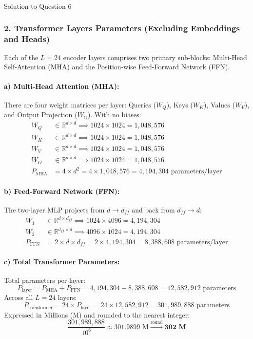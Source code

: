 \documentclass[11pt,a4paper]{article}
\begin{document}
\begin{solutionbox}{Solution to Question 6}
\subsubsection*{2. Transformer Layers Parameters (Excluding Embeddings and Heads)}
Each of the $L = 24$ encoder layers comprises two primary sub-blocks: Multi-Head Self-Attention (MHA) and the Position-wise Feed-Forward Network (FFN).

\paragraph{a) Multi-Head Attention (MHA):}
There are four weight matrices per layer: Queries ($W_Q$), Keys ($W_K$), Values ($W_V$), and Output Projection ($W_O$). With no biases:
\begin{align*}
W_Q &\in \mathbb{R}^{d \times d} \implies 1024 \times 1024 = 1,048,576 \\
W_K &\in \mathbb{R}^{d \times d} \implies 1024 \times 1024 = 1,048,576 \\
W_V &\in \mathbb{R}^{d \times d} \implies 1024 \times 1024 = 1,048,576 \\
W_O &\in \mathbb{R}^{d \times d} \implies 1024 \times 1024 = 1,048,576 \\
P_{\text{MHA}} &= 4 \times d^2 = 4 \times 1,048,576 = 4,194,304 \text{ parameters/layer}
\end{align*}

\paragraph{b) Feed-Forward Network (FFN):}
The two-layer MLP projects from $d \to d_{ff}$ and back from $d_{ff} \to d$:
\begin{align*}
W_1 &\in \mathbb{R}^{d \times d_{ff}} \implies 1024 \times 4096 = 4,194,304 \\
W_2 &\in \mathbb{R}^{d_{ff} \times d} \implies 4096 \times 1024 = 4,194,304 \\
P_{\text{FFN}} &= 2 \times d \times d_{ff} = 2 \times 4,194,304 = 8,388,608 \text{ parameters/layer}
\end{align*}

\paragraph{c) Total Transformer Parameters:}
Total parameters per layer:
\[
P_{\text{layer}} = P_{\text{MHA}} + P_{\text{FFN}} = 4,194,304 + 8,388,608 = 12,582,912 \text{ parameters}
\]
Across all $L = 24$ layers:
\[
P_{\text{transformer}} = 24 \times P_{\text{layer}} = 24 \times 12,582,912 = 301,989,888 \text{ parameters}
\]
Expressed in Millions (M) and rounded to the nearest integer:
\[
\frac{301,989,888}{10^6} \approx 301.9899 \text{ M} \xrightarrow{\text{round}} \mathbf{302 \text{ M}}
\]


\end{solutionbox}
\end{document}
